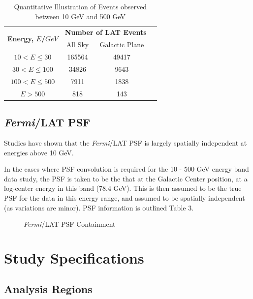 \documentclass{PoS}
\begin{document}
\begin{table}
\centering
\begin{tabular}{|c|c|c|c|}
\hline
\multirow{2}{*}{\textbf{Energy, $E$/$GeV$}} & \multicolumn{2}{|c|}{\textbf{Number of LAT Events}}\\
 & All Sky & Galactic Plane \\\hline
$10 < E \leq 30$ & 165564 & 49417 \\\hline
$30 < E \leq 100$ & 34826 & 9643 \\\hline
$100 < E \leq 500$ & 7911 & 1838 \\\hline
$ E > 500$ & 818 & 143 \\\hline
\end{tabular}
\caption{Quantitative Illustration of Events observed between 10 GeV and 500 GeV}
\end{table}

\subsection{\textit{Fermi}/LAT PSF}


Studies have shown that the \textit{Fermi}/LAT PSF is largely spatially independent at energies above 10 GeV.


In the cases where PSF convolution is required for the 10 - 500 GeV energy band data study, the PSF is taken to be the that at the Galactic Center position, at a log-center energy in this band (78.4 GeV). This is then assumed to be the true PSF for the data in this energy range, and assumed to be spatially independent (as variations are minor). PSF information is outlined Table 3.


\begin{figure}
\centering
{}
\caption{\textit{Fermi}/LAT PSF Containment}
\end{figure}


\section{Study Specifications}

\subsection{Analysis Regions}
\end{document}
